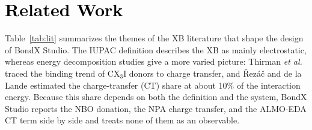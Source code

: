 \documentclass[journal=jcisd8,manuscript=article,layout=two-column]{achemso}
\newcommand{\tcb}[1]{{\textcolor{black}{#1}}}
\newcommand{\BX}{BondX Studio}
\begin{document}
\section{\tcb{Related Work}}
Table~\ref{tab:lit} summarizes the themes of the XB literature that shape the design of \BX{}. The IUPAC definition describes the XB as mainly electrostatic,\cite{Desiraju2013} whereas energy decomposition studies give a more varied picture: Thirman \emph{et al.} traced the binding trend of CX$_3$I donors to charge transfer,\cite{Thirman2018} and \v{R}ez\'a\v{c} and de la Lande estimated the charge-transfer (CT) share at about 10\% of the interaction energy.\cite{Rezac2017CT} Because this share depends on both the definition and the system, \BX{} reports the NBO donation, the NPA charge transfer, and the ALMO-EDA CT term side by side and treats none of them as an observable.
\end{document}
